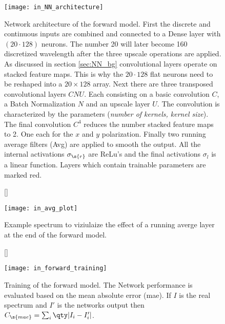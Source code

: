 \begin{figure}[H]
    \centering
    \texttt{[image: in\_NN\_architecture]}
    \caption{Network architecture of the forward model. First the discrete and continuous inputs are combined and connected to a Dense layer with 
    $(20 \cdot 128)$
    neurons. The number 20 will later become 160 discretized wavelength after the three upscale operations are applied. As discussed in section \ref{sec:NN_bg} convolutional layers operate on stacked feature maps. This is why the $20 \cdot 128$ flat neurons need to be reshaped into a $20 \times 128$ array. Next there are three transposed convolutional layers $CNU$. Each consisting on a basic convolution $C$, a Batch Normalization $N$ and an upscale layer $U$. The convolution is characterized by the parameters (\textit{number of kernels, kernel size}). The final convolution $C^4$ reduces the number stacked feature maps to 2. One each for the $x$ and $y$ polarization. Finally two running average filters (Avg) are applied to smooth the output. All the internal activations $\sigma_\s{r}$ are ReLu's and the final activations $\sigma_{l}$ is a linear function.
    Layers which contain trainable parameters are marked red.
    }
    \label{fig:in:NN}
\end{figure}

\begin{figure}[H]
    [\FBwidth]
    {\caption{
        Example spectrum to viziulaize the effect of a running averge layer at the end of the forward model. 
    }
    \label{fig:in:avg_plot}}
    {\texttt{[image: in\_avg\_plot]}}
\end{figure}

\begin{figure}[H]
    [\FBwidth]
    {\caption{
        Training of the forward model. The Network performance is evaluated based on the mean absolute error (mae). If $I$ is the real spectrum and $I'$ is the networks output then 
        $C_\s{mae} = \sum_i \qty|I_i - I'_i|$.
    }
    \label{fig:in:forward_training}}
    {\texttt{[image: in\_forward\_training]}}
\end{figure}

